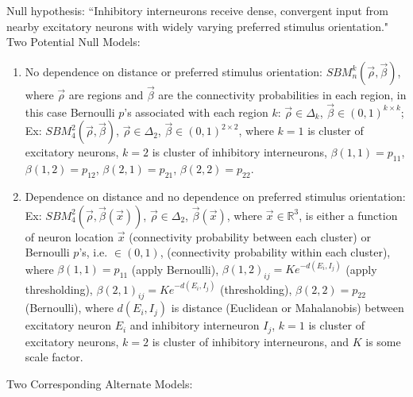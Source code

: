 \documentclass[12pt]{iopart}
\begin{document}
Null hypothesis:  ``Inhibitory interneurons receive dense, convergent input from nearby excitatory neurons with widely varying preferred stimulus orientation."
\newline
\newline
Two Potential Null Models:  
\begin{enumerate}
\item No dependence on distance or preferred stimulus orientation:  $SBM_{n}^{k}(\vec{\rho},\vec{\beta})$, where $\vec{\rho}$ are regions and $\vec{\beta}$ are the connectivity probabilities in each region, in this case Bernoulli $p$'s associated with each region $k$: $\vec{\rho}\in\Delta_{k}$, $\vec{\beta}\in(0,1)^{k\times k}$; Ex:  $SBM_{4}^{2}(\vec{\rho},\vec{\beta})$, $\vec{\rho}\in\Delta_{2}$, $\vec{\beta}\in(0,1)^{2\times 2}$, where $k=1$ is cluster of excitatory neurons, $k=2$ is cluster of inhibitory interneurons, $\beta(1,1) = p_{11}$, $\beta(1,2) = p_{12}$, $\beta(2,1) = p_{21}$, $\beta(2,2) = p_{22}$.
\item Dependence on distance and no dependence on preferred stimulus orientation:  Ex:  $SBM_{4}^{2}(\vec{\rho},\vec{\beta}(\vec{x}))$,  $\vec{\rho}\in\Delta_{2}$, $\vec{\beta}(\vec{x})$, where $\vec{x}\in\mathbb{R}^3$, is either a function of neuron location $\vec{x}$ (connectivity probability between each cluster) or Bernoulli $p$'s, i.e. $\in(0,1)$, (connectivity probability within each cluster), where $\beta(1,1) = p_{11}$ (apply Bernoulli), $\beta(1,2)_{ij} = Ke^{-d(E_i,I_j)}$ (apply thresholding), $\beta(2,1)_{ij} = Ke^{-d(E_i,I_j)}$ (thresholding), $\beta(2,2) = p_{22}$ (Bernoulli), where $d(E_i,I_j)$ is distance (Euclidean or Mahalanobis) between excitatory neuron $E_i$ and inhibitory interneuron $I_j$, $k=1$ is cluster of excitatory neurons, $k=2$ is cluster of inhibitory interneurons, and $K$ is some scale factor.
\end{enumerate}
Two Corresponding Alternate Models:  
\end{document}
